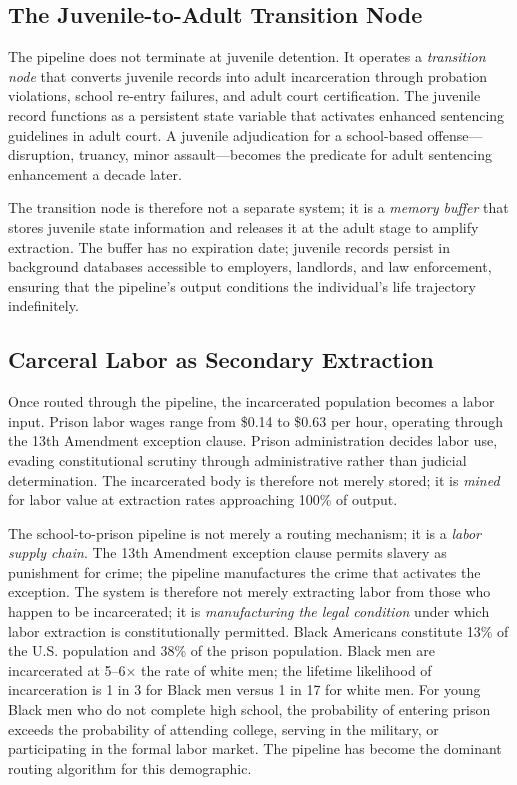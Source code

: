 \subsection{The Juvenile-to-Adult Transition Node}

The pipeline does not terminate at juvenile detention. It operates a \textit{transition node} that converts juvenile records into adult incarceration through probation violations, school re-entry failures, and adult court certification. The juvenile record functions as a persistent state variable that activates enhanced sentencing guidelines in adult court. A juvenile adjudication for a school-based offense---disruption, truancy, minor assault---becomes the predicate for adult sentencing enhancement a decade later.

The transition node is therefore not a separate system; it is a \textit{memory buffer} that stores juvenile state information and releases it at the adult stage to amplify extraction. The buffer has no expiration date; juvenile records persist in background databases accessible to employers, landlords, and law enforcement, ensuring that the pipeline's output conditions the individual's life trajectory indefinitely.

\subsection{Carceral Labor as Secondary Extraction}

Once routed through the pipeline, the incarcerated population becomes a labor input. Prison labor wages range from \$0.14 to \$0.63 per hour, operating through the 13th Amendment exception clause. Prison administration decides labor use, evading constitutional scrutiny through administrative rather than judicial determination. The incarcerated body is therefore not merely stored; it is \textit{mined} for labor value at extraction rates approaching 100\% of output.

The school-to-prison pipeline is not merely a routing mechanism; it is a \textit{labor supply chain}. The 13th Amendment exception clause permits slavery as punishment for crime; the pipeline manufactures the crime that activates the exception. The system is therefore not merely extracting labor from those who happen to be incarcerated; it is \textit{manufacturing the legal condition} under which labor extraction is constitutionally permitted. Black Americans constitute 13\% of the U.S. population and 38\% of the prison population. Black men are incarcerated at 5--6$\times$ the rate of white men; the lifetime likelihood of incarceration is 1 in 3 for Black men versus 1 in 17 for white men. For young Black men who do not complete high school, the probability of entering prison exceeds the probability of attending college, serving in the military, or participating in the formal labor market. The pipeline has become the dominant routing algorithm for this demographic.

